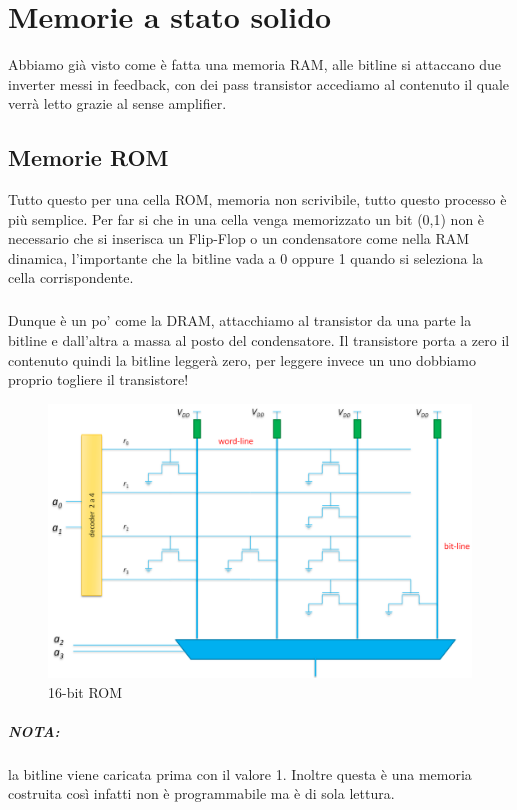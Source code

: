 \chapter{Memorie a stato solido} 

Abbiamo già visto come è  fatta una memoria RAM, alle bitline si attaccano due inverter messi in feedback, con dei pass transistor accediamo al contenuto il quale verrà letto grazie al sense amplifier. 

\section{Memorie ROM}

Tutto questo per una cella ROM, memoria non scrivibile, tutto questo processo  è più semplice. Per far si che in una cella venga memorizzato un bit (0,1) non è necessario che si inserisca un Flip-Flop o un condensatore come nella RAM dinamica, l'importante che la bitline vada a 0 oppure 1 quando si seleziona la cella corrispondente.

\paragraph{}
Dunque è un po' come la DRAM, attacchiamo al transistor da una parte la bitline e dall'altra a massa al posto del condensatore. Il transistore porta a zero il contenuto quindi la bitline leggerà zero, per leggere invece un uno dobbiamo proprio togliere il transistore! 


\begin{figure}[htbp]
    \centering
    \includegraphics[width=0.7\linewidth]{img/mhtjg.png}
    \caption{16-bit ROM}
\end{figure}

\paragraph{NOTA:} la bitline viene caricata prima con il valore 1. Inoltre questa è una memoria costruita così infatti non è programmabile ma è di sola lettura.

